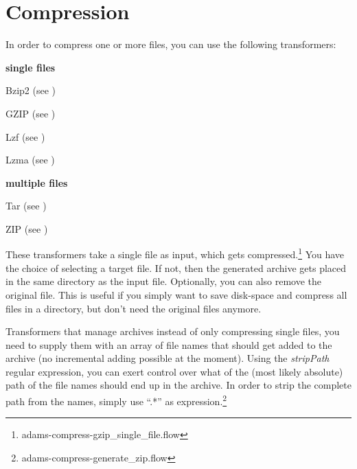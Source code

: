 \documentclass[a4paper]{book}
\begin{document}
\chapter{Compression}
In order to compress one or more files, you can use the following transformers:
\begin{tight_itemize}
	\item \textbf{single files}
	\begin{tight_itemize}
		\item Bzip2 (see \cite{bzip2})
		\item GZIP (see \cite{gzip})
		\item Lzf (see \cite{lzf})
		\item Lzma (see \cite{lzma})
	\end{tight_itemize}
	\item \textbf{multiple files}
	\begin{tight_itemize}
		\item Tar (see \cite{tar})
		\item ZIP (see \cite{zip})
	\end{tight_itemize}
\end{tight_itemize}

These transformers take a single file as input, which gets 
compressed.\footnote{adams-compress-gzip\_single\_file.flow}
You have the choice of selecting a target file. If not, then the generated
archive gets placed in the same directory as the input file. Optionally,
you can also remove the original file. This is useful if you simply want
to save disk-space and compress all files in a directory, but don't need
the original files anymore.

Transformers that manage archives instead of only compressing single files,
you need to supply them with an array of file names that should get added
to the archive (no incremental adding possible at the moment). Using the
\textit{stripPath} regular expression, you can exert control over what of
the (most likely absolute) path of the file names should end up in the
archive. In order to strip the complete path from the names, simply use
``.*'' as expression.\footnote{adams-compress-generate\_zip.flow}


\end{document}
